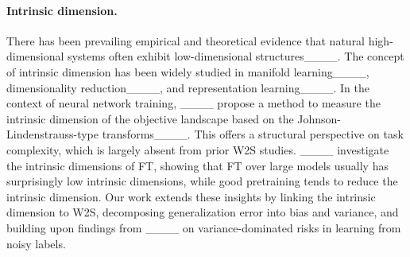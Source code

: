 \paragraph{Intrinsic dimension.} 
There has been prevailing empirical and theoretical evidence that natural high-dimensional systems often exhibit low-dimensional structures____.
The concept of intrinsic dimension has been widely studied in manifold learning____, dimensionality reduction____, and representation learning____.
In the context of neural network training, ____ propose a method to measure the intrinsic dimension of the objective landscape based on the Johnson-Lindenstrauss-type transforms____. 
This offers a structural perspective on task complexity, which is largely absent from prior W2S studies. 
____ investigate the intrinsic dimensions of FT, showing that FT over large models usually has surprisingly low intrinsic dimensions, while good pretraining tends to reduce the intrinsic dimension.
Our work extends these insights by linking the intrinsic dimension to W2S, decomposing generalization error into bias and variance, and building upon findings from ____ on variance-dominated risks in learning from noisy labels.